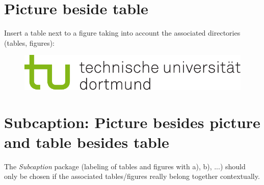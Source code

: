 \section{Picture beside table}
Insert a table next to a figure taking into account the associated directories (tables, figures):
\begin{figure}[htbp]
%
	\begin{minipage}[t]{0.45\textwidth}
	\centering
	\label{tab:bsp2}
	\end{minipage}
%
	\begin{minipage}[t]{0.45\textwidth}
	\centering
	  \includegraphics[width=\textwidth]{images/logos/tud_logo_rgb}
	\end{minipage}
\end{figure}

\section{Subcaption: Picture besides picture and table besides table}

The \textit{Subcaption} package (labeling of tables and figures with a), b), ...) should only be chosen if the associated tables/figures really belong together contextually.

